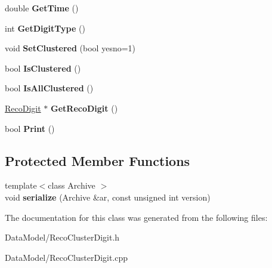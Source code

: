 \begin{DoxyCompactItemize}
\item 
\hypertarget{classRecoClusterDigit_a249e0c613ce90b65452e1d222a69950d}{double {\bfseries Get\-Time} ()}\label{classRecoClusterDigit_a249e0c613ce90b65452e1d222a69950d}

\item 
\hypertarget{classRecoClusterDigit_a43c25fb022fe47ccba3f506a71d29352}{int {\bfseries Get\-Digit\-Type} ()}\label{classRecoClusterDigit_a43c25fb022fe47ccba3f506a71d29352}

\item 
\hypertarget{classRecoClusterDigit_a357a8d13a80019ad4b07bb096060b8b8}{void {\bfseries Set\-Clustered} (bool yesno=1)}\label{classRecoClusterDigit_a357a8d13a80019ad4b07bb096060b8b8}

\item 
\hypertarget{classRecoClusterDigit_a5b5e2d3c11bf6172942ec9ebff304cd2}{bool {\bfseries Is\-Clustered} ()}\label{classRecoClusterDigit_a5b5e2d3c11bf6172942ec9ebff304cd2}

\item 
\hypertarget{classRecoClusterDigit_ae19e3c19ea0a254249dac74b7c6700b9}{bool {\bfseries Is\-All\-Clustered} ()}\label{classRecoClusterDigit_ae19e3c19ea0a254249dac74b7c6700b9}

\item 
\hypertarget{classRecoClusterDigit_a55d53c78d90b82febf40a53ff62197e6}{\hyperlink{classRecoDigit}{Reco\-Digit} $\ast$ {\bfseries Get\-Reco\-Digit} ()}\label{classRecoClusterDigit_a55d53c78d90b82febf40a53ff62197e6}

\item 
\hypertarget{classRecoClusterDigit_ac60c305ecfa4b1436fb277daa1909db8}{bool {\bfseries Print} ()}\label{classRecoClusterDigit_ac60c305ecfa4b1436fb277daa1909db8}

\end{DoxyCompactItemize}
\subsection*{Protected Member Functions}
\begin{DoxyCompactItemize}
\item 
\hypertarget{classRecoClusterDigit_ac83475905d389c2170c039b7e00ae5ff}{{\footnotesize template$<$class Archive $>$ }\\void {\bfseries serialize} (Archive \&ar, const unsigned int version)}\label{classRecoClusterDigit_ac83475905d389c2170c039b7e00ae5ff}

\end{DoxyCompactItemize}


The documentation for this class was generated from the following files\-:\begin{DoxyCompactItemize}
\item 
Data\-Model/Reco\-Cluster\-Digit.\-h\item 
Data\-Model/Reco\-Cluster\-Digit.\-cpp\end{DoxyCompactItemize}
